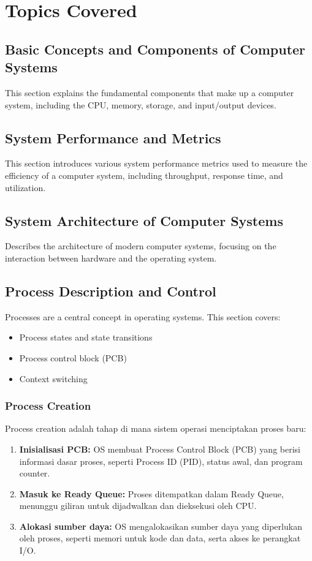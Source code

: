 \documentclass[12pt]{article}
\begin{document}
\section{Topics Covered}

\subsection{Basic Concepts and Components of Computer Systems}
This section explains the fundamental components that make up a computer system, including the CPU, memory, storage, and input/output devices.

\subsection{System Performance and Metrics}
This section introduces various system performance metrics used to measure the efficiency of a computer system, including throughput, response time, and utilization.

\subsection{System Architecture of Computer Systems}
Describes the architecture of modern computer systems, focusing on the interaction between hardware and the operating system.

\subsection{Process Description and Control}
Processes are a central concept in operating systems. This section covers:
\begin{itemize}
    \item Process states and state transitions
    \item Process control block (PCB)
    \item Context switching
\end{itemize}

\subsubsection{Process Creation}
Process creation adalah tahap di mana sistem operasi menciptakan proses baru:
\begin{enumerate}
    \item \textbf{Inisialisasi PCB:} OS membuat Process Control Block (PCB) yang berisi informasi dasar proses, seperti Process ID (PID), status awal, dan program counter.
    \item \textbf{Masuk ke Ready Queue:} Proses ditempatkan dalam Ready Queue, menunggu giliran untuk dijadwalkan dan dieksekusi oleh CPU.
    \item \textbf{Alokasi sumber daya:} OS mengalokasikan sumber daya yang diperlukan oleh proses, seperti memori untuk kode dan data, serta akses ke perangkat I/O.
\end{enumerate}
\end{document}
